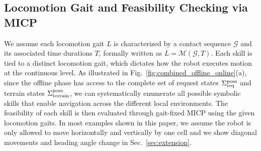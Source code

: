 
\subsection{Locomotion Gait and Feasibility Checking via MICP}\label{sec:motion_primitive} 
We assume each locomotion gait $L$ is characterized by a contact sequence $\mathcal{G}$ and its associated time durations $T$, formally written as $L = \mathcal{M}(\mathcal{G}, T)$. Each skill is tied to a distinct locomotion gait, which dictates how the robot executes motion at the continuous level.
As illustrated in Fig.~\ref{fig:combined_offline_online}(a), since the offline phase has access to the complete set of request states $\Sigma_{\textrm{req}}^{\textrm{poss}}$ and terrain states $\Sigma_{\textrm{terrain}}^{\textrm{poss}}$, we can systematically enumerate all possible symbolic skills that enable navigation across the different local environments. The feasibility of each skill is then evaluated through gait-fixed MICP using the given locomotion gaits.
In most examples shown in this paper, we assume the robot is only allowed to move horizontally and vertically by one cell and we show diagonal movements and heading angle change in Sec.~\ref{sec:extension}.

